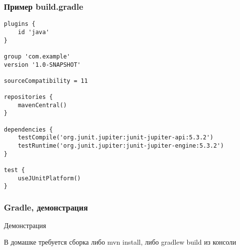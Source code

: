 \documentclass[xetex,mathserif,serif]{beamer}
\begin{document}
	\begin{frame}[fragile]
		\frametitle{Пример build.gradle}
		\begin{scriptsize}
			\begin{verbatim}
plugins {
    id 'java'
}

group 'com.example'
version '1.0-SNAPSHOT'

sourceCompatibility = 11

repositories {
    mavenCentral()
}

dependencies {
    testCompile('org.junit.jupiter:junit-jupiter-api:5.3.2')
    testRuntime('org.junit.jupiter:junit-jupiter-engine:5.3.2')
}

test {
    useJUnitPlatform()
}
			\end{verbatim}
		\end{scriptsize}
	\end{frame}

	\begin{frame}
		\frametitle{Gradle, демонстрация}
		\begin{center}
			\huge{Демонстрация}
		\end{center}
		\vspace{3cm}
		\begin{center}
			В домашке требуется сборка либо mvn install, либо gradlew build из консоли
		\end{center}
	\end{frame}
\end{document}
